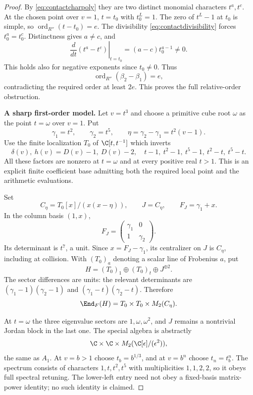 \begin{proof}
By \eqref{eq:contactcharpoly} they are two distinct
monomial characters $t^a,t^c$.
At the chosen point over $v=1$, $t=t_0$ with
$t_0^L=1$. The zero of $t^L-1$ at $t_0$ is simple,
so $\operatorname{ord}_{R''}(t-t_0)=e$.
The divisibility \eqref{eq:contactdivisibility}
forces $t_0^a=t_0^c$.
Distinctness gives $a\ne c$, and
\[
 \left.\frac{d}{dt}(t^a-t^c)\right|_{t=t_0}
       =(a-c)t_0^{a-1}\ne0.
\]
This holds also for negative exponents since
$t_0\ne0$. Thus
\[
 \operatorname{ord}_{R''}(\beta_2-\beta_1)=e,
\]
contradicting the required order at least $2e$.
This proves the full relative-order obstruction.

\par\smallskip\noindent\textbf{A sharp first-order model.}\quad
Let $v=t^3$ and choose a primitive cube root $\omega$
as the point $t=\omega$ over $v=1$. Put
\[
 \gamma_1=t^2,\qquad \gamma_2=t^5,\qquad
 \eta=\gamma_2-\gamma_1=t^2(v-1).
\]
Use the finite localization $T_0$ of $\C[t,t^{-1}]$
which inverts
\[
 \delta(v),\ h(v)=D(v)-1,\ D(v)-2,\quad
 t-1,\ t^2-1,\ t^5-1,\ t^2-t,\ t^5-t.
\]
All these factors are nonzero at $t=\omega$ and
at every positive real $t>1$.
This is an explicit finite coefficient base admitting
both the required local point and the arithmetic
evaluations.

Set
\[
 C_\eta=T_0[x]/(x(x-\eta)),\qquad
 J=C_\eta,\qquad F_J=\gamma_1+x.
\]
In the column basis $(1,x)$,
\[
 F_J=\begin{pmatrix}\gamma_1&0\\1&\gamma_2\end{pmatrix}.
\]
Its determinant is $t^7$, a unit.
Since $x=F_J-\gamma_1$, its centralizer on $J$ is
$C_\eta$, including at collision.
With $(T_0)_a$ denoting a scalar line of Frobenius $a$,
put
\[
 H=(T_0)_1\oplus(T_0)_t\oplus J^{\oplus2}.
\]
The sector differences are units:
the relevant determinants are
$(\gamma_1-1)(\gamma_2-1)$ and
$(\gamma_1-t)(\gamma_2-t)$.
Therefore
\begin{equation}\label{eq:firstordercentralizer}
 \End_F(H)=T_0\times T_0\times M_2(C_\eta).
\end{equation}

At $t=\omega$ the three eigenvalue sectors are
$1,\omega,\omega^2$, and $J$ remains a nontrivial
Jordan block in the last one.
The special algebra is abstractly
\[
 \C\times\C\times M_2(\C[\epsilon]/(\epsilon^2)),
\]
the same as $A_1$.
At $v=b>1$ choose $t_b=b^{1/3}$, and at $v=b^n$
choose $t_n=t_b^n$.
The spectrum consists of characters $1,t,t^2,t^5$
with multiplicities $1,1,2,2$, so it obeys full
spectral retuning.
The lower-left entry need not obey a fixed-basis
matrix-power identity; no such identity is claimed.


\end{proof}
